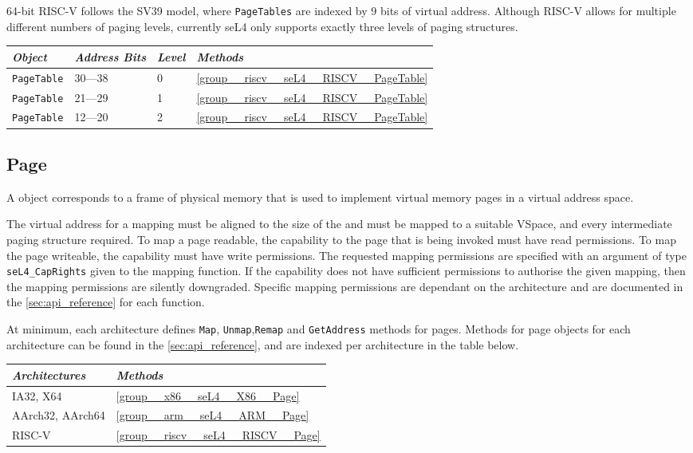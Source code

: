 64-bit RISC-V follows the SV39 model, where \texttt{PageTables} are indexed by 9 bits of virtual address.
Although RISC-V allows
for multiple different numbers of paging levels, currently seL4 only supports exactly three levels
of paging structures.

\begin{tabularx}{\textwidth}{Xlll} \toprule
\emph{Object}          & \emph{Address Bits} & \emph{Level} & \emph{Methods} \\ \midrule
\texttt{PageTable}     & 30---38             & 0            & \autoref{group__riscv__seL4__RISCV__PageTable} \\
\texttt{PageTable}     & 21---29             & 1            & \autoref{group__riscv__seL4__RISCV__PageTable} \\
\texttt{PageTable}     & 12---20             & 2            & \autoref{group__riscv__seL4__RISCV__PageTable} \\
\bottomrule
\end{tabularx}

\subsection{Page}

A  object corresponds to a frame of physical memory that is used to
implement virtual memory pages in a virtual address space.

The virtual address for a  mapping
must be aligned to
the size of the  and must be mapped to a suitable VSpace, and every intermediate paging
structure required.
To map a page readable, the capability
to the page
that is being invoked must have read permissions. To map the page
writeable, the capability must have write permissions. The requested
mapping permissions are specified with an argument of type
\texttt{seL4\_CapRights} given to the mapping function.
If the capability does not have
sufficient permissions to authorise the given mapping, then
the mapping permissions are silently downgraded. Specific mapping permissions are dependant on the
architecture and are documented in the \autoref{sec:api_reference} for each function.

At minimum, each architecture defines \texttt{Map}, \texttt{Unmap},\texttt{Remap} and
\texttt{GetAddress} methods for pages.
Methods for page objects for each architecture can be found in the \autoref{sec:api_reference}, and
are indexed per architecture in the table below.

\begin{tabularx}{\textwidth}{Xl} \toprule
\emph{Architectures} & \emph{Methods} \\ \midrule
IA32, X64            & \autoref{group__x86__seL4__X86__Page} \\
AArch32, AArch64     & \autoref{group__arm__seL4__ARM__Page} \\
    RISC-V           & \autoref{group__riscv__seL4__RISCV__Page} \\
\bottomrule
\end{tabularx}

